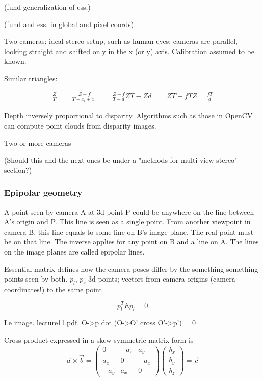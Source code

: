 (fund generalization of ess.)

(fund and ess. in global and pixel coords)

Two cameras: ideal stereo setup, such as human eyes; cameras are parallel, looking straight and shifted only in the x (or y) axis. Calibration assumed to be known.

Similar triangles:

\begin{align}
	\frac{Z}{T} &= \frac{Z-f}{T - x_l + x_r} &= \frac{Z-f}{T - d}
	ZT - Zd &= ZT - fT
	Z = \frac{fT}{d}
\end{align}


Depth inversely proportional to disparity. Algorithms such as those in OpenCV can compute point clouds from disparity images.

Two or more cameras

(Should this and the next ones be under a "methods for multi view stereo" section?)

\subsubsection{Epipolar geometry}

A point seen by camera A at 3d point P could be anywhere on the line between A's origin and P.
This line is seen as a single point.
From another viewpoint in camera B, this line equals to some line on B's image plane.
The real point must be on that line.
The inverse applies for any point on B and a line on A.
The lines on the image planes are called epipolar lines.


Essential matrix defines how the camera poses differ by the something something points seen by both. $p_l$, $p_r$ 3d points; vectors from camera origins (camera coordinates!) to the same point

\[
	p_l^T E p_l = 0
\]

Le image. lecture11.pdf. O->p dot (O->O' cross O'->p') = 0

Cross product expressed in a skew-symmetric matrix form is
\begin{equation}
\vec a \times \vec b =
\begin{pmatrix}
	 0   & -a_z &  a_y\\
	 a_z &  0   & -a_x\\
	-a_y &  a_x & 0
\end{pmatrix}
\begin{pmatrix}
	b_x\\b_y\\b_z
\end{pmatrix}
= \vec c
\end{equation}


